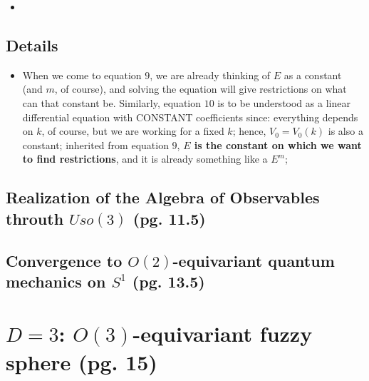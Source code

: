 \documentclass{article}
\begin{document}
    \begin{itemize}

    \item 
    
    \end{itemize}

\subsection*{Details}

    \begin{itemize}

    \item When we come to equation $9$, we are already thinking of $E$ as a constant (and $m$, of course), and solving the equation will give restrictions on what can that constant be. Similarly, equation $10$ is to be understood as a linear differential equation with CONSTANT coefficients since: everything depends on $k$, of course, but we are working for a fixed $k$; hence, $V_0 = V_0(k)$ is also a constant; inherited from equation $9$, \textbf{$E$ is the constant on which we want to find restrictions}, and it is already something like a $E^m$; 
    
    \end{itemize}

\subsection{Realization of the Algebra of Observables throuth $Uso(3)$ (pg. 11.5)}

\subsection{Convergence to $O(2)$-equivariant quantum mechanics on $S^1$ (pg. 13.5)}

\section{$D=3$: $O(3)$-equivariant fuzzy sphere (pg. 15)}

\end{document}
